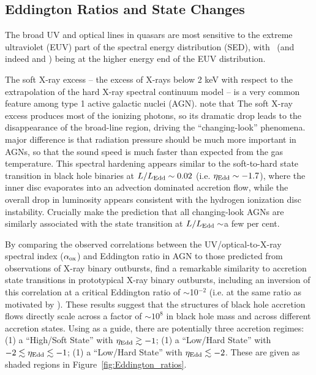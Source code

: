 \documentclass[fleqn,usenatbib]{mnras}
\begin{document}
\subsection{Eddington Ratios and State Changes} 
The broad UV and optical lines in quasars are most sensitive to the
extreme ultraviolet (EUV) part of the spectral energy distribution
(SED), with \civ\ (and indeed \heii and \nv) being at the higher
energy end of the EUV distribution.

The soft X-ray excess -- the excess of X-rays below 2 keV with respect
to the extrapolation of the hard X-ray spectral continuum model -- is
a very common feature among type 1 active galactic nuclei (AGN). 
\citet{NodaDone2018} note that
The soft X-ray excess produces most of the ionizing photons, so its
dramatic drop leads to the disappearance of the broad-line region,
driving the ``changing-look'' phenomena.  major difference is that
radiation pressure should be much more important in AGNs, so that the
sound speed is much faster than expected from the gas temperature.
This spectral hardening appears similar to the soft-to-hard state
transition in black hole binaries at $L / L_{\rm Edd} \sim 0.02$
(i.e. $\eta_{\rm Edd} \sim -1.7$), where the inner disc evaporates into
an advection dominated accretion flow, while the overall drop in
luminosity appears consistent with the hydrogen ionization disc
instability.  Crucially \citet{NodaDone2018} make the prediction that
all changing-look AGNs are similarly associated with the state
transition at $L / L_{\rm Edd} \sim$a few per cent.

By comparing the observed correlations between the UV/optical-to-X-ray
spectral index ($\alpha_{\rm ox}$) and Eddington ratio in AGN to those
predicted from observations of X-ray binary outbursts,
\citet{Ruan2019a} find a remarkable similarity to accretion state transitions in prototypical
X-ray binary outbursts, including an inversion of this correlation at
a critical Eddington ratio of $\sim$10$^{-2}$ (i.e. at the same ratio
as motivated by \citet{NodaDone2018}).  These results suggest that the
structures of black hole accretion flows directly scale across a
factor of $\sim10^{8}$ in black hole mass and across different
accretion states. Using \citet{Ruan2019a} as a guide, there are potentially three accretion regimes: 
(1) a ``High/Soft State'' with $\eta_{\rm Edd} \gtrsim -1$; 
(1) a ``Low/Hard State'' with $-2 \lesssim \eta_{\rm Edd} \lesssim  -1$;
(1) a ``Low/Hard State'' with $\eta_{\rm Edd} \lesssim -2$.
These are given as shaded regions in Figure~\ref{fig:Eddington_ratios}.
\end{document}
